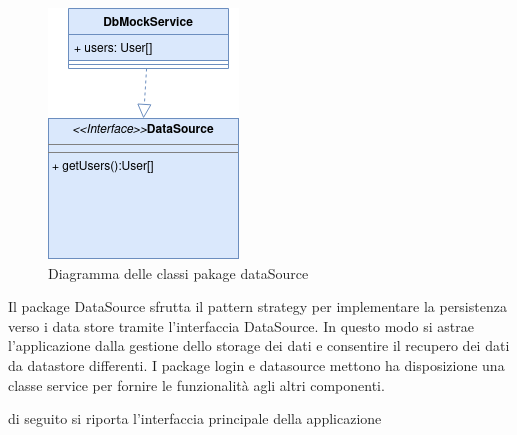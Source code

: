 \begin{figure}[H]
    \centering
 \includegraphics[scale=0.7]{resources/diagramma_package-dataSource.drawio.png}
   \caption{Diagramma delle classi pakage dataSource}
\end{figure}
Il package DataSource sfrutta il pattern strategy per implementare la persistenza verso i data store tramite l'interfaccia DataSource. In questo modo si astrae l'applicazione dalla gestione dello storage dei dati e consentire il recupero dei dati da datastore differenti.
\newline
I package login e datasource mettono ha disposizione una classe service per fornire le funzionalità agli altri componenti.




di seguito si riporta l'interfaccia principale della applicazione

